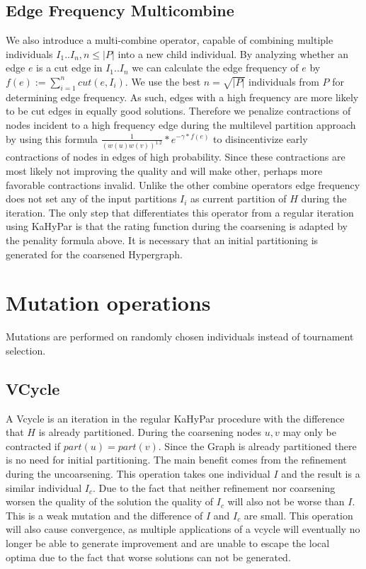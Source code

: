 \documentclass[a4paper,12pt,bibtotoc,titlepage, liststotoc,BCOR7mm,headsepline,pointlessnumbers]{scrbook}
\numberwithin{equation}{section}
\begin{document}
\subsection{Edge Frequency Multicombine}
We also introduce a multi-combine operator, capable of combining multiple individuals $I_1.. I_n, n \le |P|$ into a new child individual. By analyzing whether an edge $e$ is a cut edge in $I_1 ..I_n$ we can calculate the edge frequency of $e$ by $f(e) := \sum_{i=1}^n cut(e,I_i)$. We use the best $n = \sqrt{|P|}$ individuals from $P$ for determining edge frequency. As such, edges with a high frequency are more likely to be cut edges in equally good solutions. Therefore we penalize contractions of nodes incident to a high frequency edge during the multilevel partition approach by using this formula $\frac{1}{(w(u)w(v))^{1.2}}*e^{-\gamma*f(e)}$ to disincentivize early contractions of nodes in edges of high probability. Since these contractions are most likely not improving the quality and will make other, perhaps more favorable contractions invalid. Unlike the other combine operators edge frequency does not set any of the input partitions $I_i$ as current partition of $H$ during the iteration. The only step that differentiates this operator from a regular iteration using KaHyPar is that the rating function during the coarsening is adapted by the penality formula above. It is necessary that an initial partitioning is generated for the coarsened Hypergraph.
\section{Mutation operations}
Mutations are performed on randomly chosen individuals instead of tournament selection.
\subsection{VCycle}
A Vcycle is an iteration in the regular KaHyPar procedure with the difference that $H$ is already partitioned. During the coarsening nodes $u,v$ may only be contracted if $part(u) = part(v)$. Since the Graph is already partitioned there is no need for initial partitioning. The main benefit comes from the refinement during the uncoarsening. This operation takes one individual $I$ and the result is a similar individual $I_c$. Due to the fact that neither refinement nor coarsening worsen the quality of the solution the quality of $I_c$ will also not be worse than $I$. This is a weak mutation and the difference of $I$ and $I_c$ are small. This operation will also cause convergence, as multiple applications of a vcycle will eventually no longer be able to generate improvement and are unable to escape the local optima due to the fact that worse solutions can not be generated.   
\end{document}
